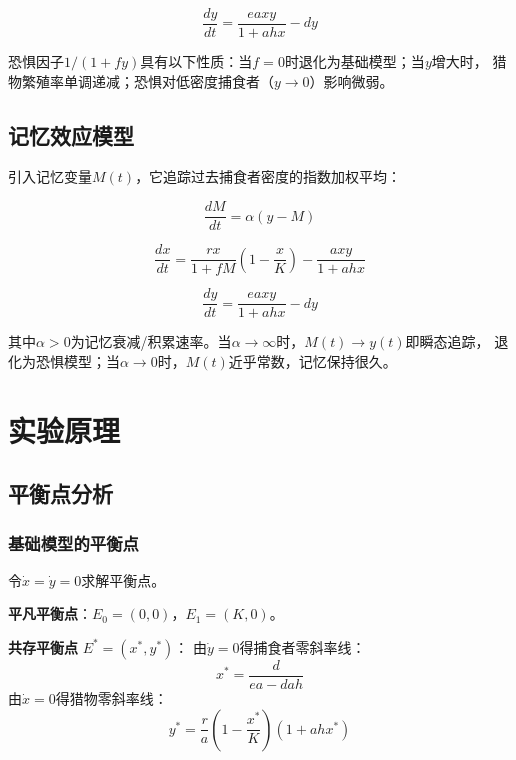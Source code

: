 \documentclass[UTF8]{ctexart}
\begin{document}
\begin{equation}\label{eq:fear_y}
    \frac{dy}{dt} = \frac{e a x y}{1 + a h x} - d y
\end{equation}

恐惧因子$1/(1+fy)$具有以下性质：当$f=0$时退化为基础模型；当$y$增大时，
猎物繁殖率单调递减；恐惧对低密度捕食者（$y \to 0$）影响微弱。

\subsection{记忆效应模型}

引入记忆变量$M(t)$，它追踪过去捕食者密度的指数加权平均：

\begin{equation}\label{eq:mem_M}
    \frac{dM}{dt} = \alpha (y - M)
\end{equation}

\begin{equation}\label{eq:mem_x}
    \frac{dx}{dt} = \frac{r x}{1 + f M} \left(1 - \frac{x}{K}\right) - \frac{a x y}{1 + a h x}
\end{equation}

\begin{equation}\label{eq:mem_y}
    \frac{dy}{dt} = \frac{e a x y}{1 + a h x} - d y
\end{equation}

其中$\alpha > 0$为记忆衰减/积累速率。当$\alpha \to \infty$时，$M(t) \to y(t)$即瞬态追踪，
退化为恐惧模型；当$\alpha \to 0$时，$M(t)$近乎常数，记忆保持很久。

\section{实验原理}

\subsection{平衡点分析}

\subsubsection{基础模型的平衡点}

令$\dot{x} = \dot{y} = 0$求解平衡点。

\textbf{平凡平衡点}：$E_0 = (0, 0)$，$E_1 = (K, 0)$。

\textbf{共存平衡点} $E^* = (x^*, y^*)$：
由$\dot{y}=0$得捕食者零斜率线：
\begin{equation}
    x^* = \frac{d}{e a - d a h}
\end{equation}
由$\dot{x}=0$得猎物零斜率线：
\begin{equation}
    y^* = \frac{r}{a}\left(1 - \frac{x^*}{K}\right)(1 + a h x^*)
\end{equation}
\end{document}
